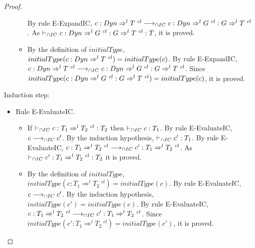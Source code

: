 \documentclass[a4paper]{article}
\begin{document}
\begin{proof}
\begin{itemize}
\begin{itemize}
        By rule E-ExpandIC, $c : Dyn \Rightarrow^l T\ ^{cl} \longrightarrow_{\cap IC} c : Dyn \Rightarrow^l G\ ^{cl} : G \Rightarrow^l T\ ^{cl}$.
        As $\vdash_{\cap IC} c : Dyn \Rightarrow^l G\ ^{cl} : G \Rightarrow^l T\ ^{cl} : T$, it is proved.
        \item By the definition of $initialType$, $initialType(c : Dyn \Rightarrow^l T\ ^{cl}) = initialType(c)$.
        By rule E-ExpandIC, $c : Dyn \Rightarrow^l T\ ^{cl} \longrightarrow_{\cap IC} c : Dyn \Rightarrow^l G\ ^{cl} : G \Rightarrow^l T\ ^{cl}$.
        Since $initialType(c : Dyn \Rightarrow^l G\ ^{cl} : G \Rightarrow^l T\ ^{cl}) = initialType(c)$, it is proved.
    \end{itemize}
\end{itemize}
Induction step:
\begin{itemize}
    \item Rule E-EvaluateIC.
    \begin{itemize}
        \item If $\icts c : T_1 \Rightarrow^l T_2\ ^{cl} : T_2$ then $\vdash_{\cap IC} c : T_1$.
        By rule E-EvaluateIC, $c \longrightarrow_{\cap IC} c'$.
        By the induction hypothesis, $\vdash_{\cap IC} c' : T_1$.
        By rule E-EvaluateIC, $c : T_1 \Rightarrow^l T_2\ ^{cl} \longrightarrow_{\cap IC} c' : T_1 \Rightarrow^l T_2\ ^{cl}$.
        As $\vdash_{\cap IC} c' : T_1 \Rightarrow^l T_2\ ^{cl} : T_2$ it is proved.
        \item By the definition of $initialType$, $initialType(c : T_1 \Rightarrow^l T_2\ ^{cl}) = initialType(c)$.
        By rule E-EvaluateIC, $c \longrightarrow_{\cap IC} c'$.
        By the induction hypothesis, $initialType(c') = initialType(c)$.
        By rule E-EvaluateIC, $c : T_1 \Rightarrow^l T_2\ ^{cl} \longrightarrow_{\cap IC} c' : T_1 \Rightarrow^l T_2\ ^{cl}$.
        Since $initialType(c' : T_1 \Rightarrow^l T_2\ ^{cl}) = initialType(c')$, it is proved.
    \end{itemize}
\end{itemize}
\end{proof}
\end{document}
